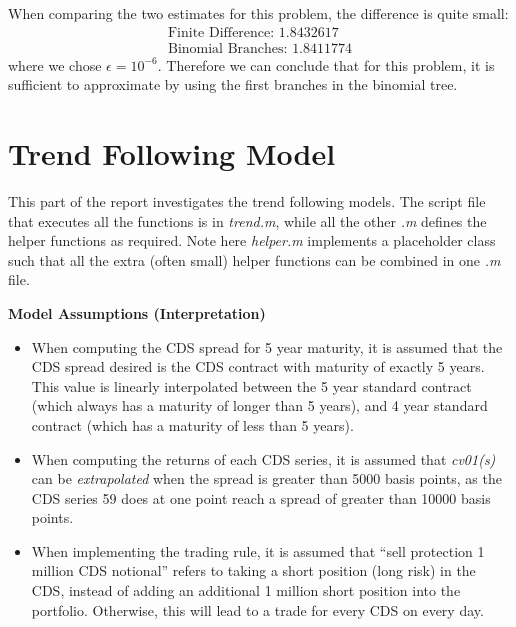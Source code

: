 \documentclass[11pt]{article}
\theoremstyle{definition}
\begin{document}
When comparing the two estimates for this problem, 
the difference is quite small:
%
\begin{equation*}
\begin{aligned}
  \text{Finite Difference: } 1.8432617 \\
  \text{Binomial Branches: } 1.8411774
\end{aligned}
\end{equation*}
%
where we chose $\epsilon = 10^{-6}$. 
Therefore we can conclude that for this problem, 
it is sufficient to approximate by 
using the first branches in the binomial tree.















\pagebreak
\section{Trend Following Model}

This part of the report investigates the trend following models.
The script file that executes all the functions is in
\emph{trend.m}, while all the other \emph{.m} defines 
the helper functions as required.
Note here \emph{helper.m} implements a placeholder class
such that all the extra (often small) helper functions can be 
combined in one \emph{.m} file.

\vspace{5mm}
\noindent
\textbf{Model Assumptions (Interpretation)}

\begin{itemize}
  \item When computing the CDS spread for 5 year maturity,
    it is assumed that the CDS spread desired is 
    the CDS contract with maturity of exactly 5 years.
    This value is linearly interpolated between
    the 5 year standard contract (which always has a maturity 
    of longer than 5 years), and 4 year standard contract 
    (which has a maturity of less than 5 years).
  \item When computing the returns of each CDS series,
    it is assumed that \emph{cv01(s)} can be \emph{extrapolated} 
    when the spread is greater than 5000 basis points,
    as the CDS series 59 does at one point reach a 
    spread of greater than 10000 basis points.
  \item When implementing the trading rule,
    it is assumed that ``sell protection 1 million CDS notional'' 
    refers to taking a short position (long risk) in the CDS, 
    instead of adding an additional 1 million short position 
    into the portfolio. 
    Otherwise, this will lead to a trade for every CDS on every day.
\end{itemize}
\end{document}
